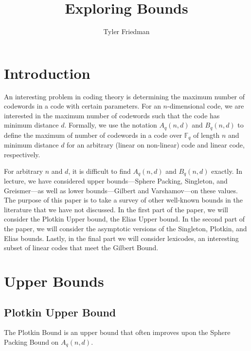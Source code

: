 \documentclass{article}
\title{Exploring Bounds}
\author{Tyler Friedman}
\theoremstyle{plain}
\theoremstyle{definition}
\begin{document}
\maketitle

\section{Introduction}

An interesting problem in coding theory is determining the maximum
number of codewords in a code with certain parameters.  For an $n$-dimensional code, we are interested in 
the maximum number of codewords such that the code has minimum distance $d$.  
Formally, we use the notation $A_q(n,d)$
and $B_q(n,d)$ to define the maximum of number of codewords in a code over
$\mathbb{F}_q$ of length $n$ and minimum distance $d$ for an arbitrary (linear
on non-linear) code and linear code, respectively.  

For arbitrary $n$ and $d$, it is difficult to find $A_q(n,d)$ and $B_q(n,d)$ exactly.
 In lecture, we have considered upper bounds---Sphere Packing, Singleton, and Greismer---as well as
lower bounds---Gilbert and Varshamov---on these values.  The purpose of this
paper is to take a survey of other well-known bounds in the literature that we have not discussed.  
In the first part of the paper, we will consider the Plotkin Upper bound, 
the Elias Upper bound.  In the second part of the paper, we will consider the asymptotic versions of the Singleton, Plotkin, and Elias bounds.  Lastly, in the final part we will consider lexicodes, an interesting subset of linear codes that meet the Gilbert Bound.

\section{Upper Bounds}

\subsection{Plotkin Upper Bound}

The Plotkin Bound is an upper bound that often improves upon the Sphere Packing Bound on $A_q(n,d)$.
\end{document}
